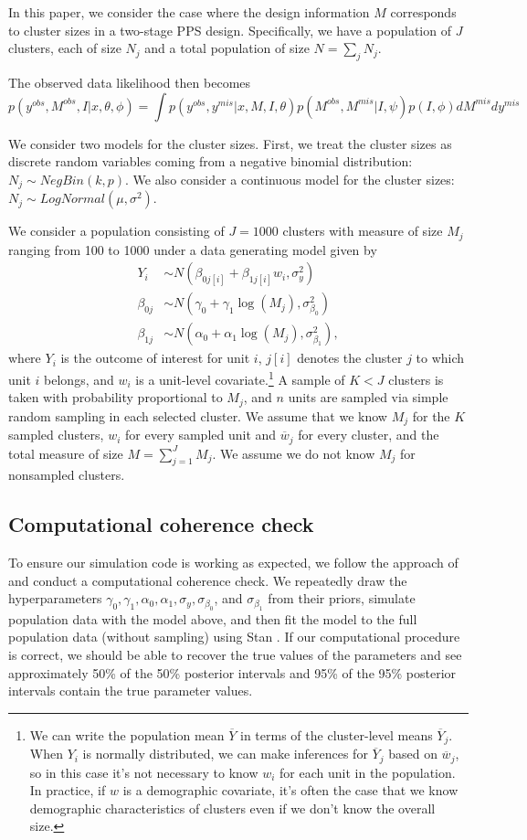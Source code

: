 \documentclass[12pt,a4paper]{article}
\begin{document}
In this paper, we consider the case where the design information $M$ corresponds to cluster sizes in a two-stage PPS design. Specifically, we have a population of $J$ clusters, each of size $N_j$ and a total population of size $N = \sum_j N_j$.

The observed data likelihood then becomes
\[
	p(y^{obs}, M^{obs}, I | x, \theta, \phi) = \int p(y^{obs}, y^{mis} | x, M, I, \theta) p(M^{obs}, M^{mis} | I, \psi) p(I, \phi) d M^{mis} d y^{mis}
\]

We consider two models for the cluster sizes. First, we treat the cluster sizes as discrete random variables coming from a negative binomial distribution: $N_j \sim NegBin(k, p)$. We also consider a continuous model for the cluster sizes: $N_j \sim LogNormal(\mu, \sigma^2)$.


We consider a population consisting of $J=1000$ clusters with measure of size $M_j$ ranging from 100 to 1000 under a data generating model given by
\begin{align*}
	Y_i &\sim N(\beta_{0j[i]} + \beta_{1j[i]} w_i, \sigma_y^2) \\
	\beta_{0j} &\sim N(\gamma_0 + \gamma_1 \log(M_j), \sigma_{\beta_0}^2)\\
	\beta_{1j} &\sim N(\alpha_0 + \alpha_1 \log(M_j), \sigma_{\beta_1}^2),
\end{align*}
where $Y_i$ is the outcome of interest for unit $i$, $j[i]$ denotes the cluster $j$ to which unit $i$ belongs, and $w_i$ is a unit-level covariate.\footnote{We can write the population mean $\overline{Y}$ in terms of the cluster-level means $\overline{Y}_j$. When $Y_i$ is normally distributed, we can make inferences for $\overline{Y}_j$ based on $\overline{w}_j$, so in this case it's not necessary to know $w_i$ for each unit in the population. In practice, if $w$ is a demographic covariate, it's often the case that we know demographic characteristics of clusters even if we don't know the overall size.} A sample of $K<J$ clusters is taken with probability proportional to $M_j$, and $n$ units are sampled via simple random sampling in each selected cluster. We assume that we know $M_j$ for the $K$ sampled clusters, $w_i$ for every sampled unit and $\overline{w}_j$ for every cluster, and the total measure of size $M = \sum_{j=1}^J M_j$. We assume we do not know $M_j$ for nonsampled clusters.

\subsection*{Computational coherence check}
To ensure our simulation code is working as expected, we follow the approach of \cite{cook2006} and conduct a computational coherence check. We repeatedly draw the hyperparameters $\gamma_0, \gamma_1, \alpha_0, \alpha_1, \sigma_y, \sigma_{\beta_0}$, and $\sigma_{\beta_1}$ from their priors, simulate population data with the model above, and then fit the model to the full population data (without sampling) using Stan \citep{stan}. If our computational procedure is correct, we should be able to recover the true values of the parameters and see approximately 50\% of the 50\% posterior intervals and 95\% of the 95\% posterior intervals contain the true parameter values.
\end{document}
